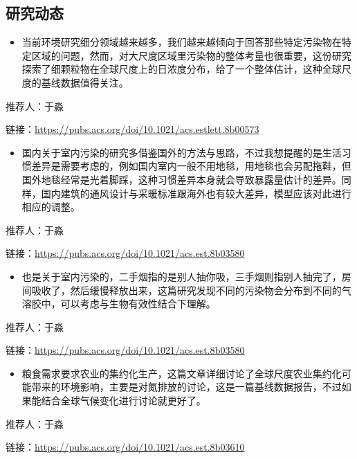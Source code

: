 \documentclass[
]{book}
\providecommand{\tightlist}{%
  \setlength{\itemsep}{0pt}\setlength{\parskip}{0pt}}
\begin{document}
\hypertarget{ux7814ux7a76ux52a8ux6001-12}{%
\subsection*{研究动态}\label{ux7814ux7a76ux52a8ux6001-12}}

\begin{itemize}
\tightlist
\item
  当前环境研究细分领域越来越多，我们越来越倾向于回答那些特定污染物在特定区域的问题，然而，对大尺度区域里污染物的整体考量也很重要，这份研究探索了细颗粒物在全球尺度上的日浓度分布，给了一个整体估计，这种全球尺度的基线数据值得关注。
\end{itemize}

推荐人：于淼

链接：\url{https://pubs.acs.org/doi/10.1021/acs.estlett.8b00573}

\begin{itemize}
\tightlist
\item
  国内关于室内污染的研究多借鉴国外的方法与思路，不过我想提醒的是生活习惯差异是需要考虑的，例如国内室内一般不用地毯，用地毯也会另配拖鞋，但国外地毯经常是光着脚踩，这种习惯差异本身就会导致暴露量估计的差异。同样，国内建筑的通风设计与采暖标准跟海外也有较大差异，模型应该对此进行相应的调整。
\end{itemize}

推荐人：于淼

链接：\url{https://pubs.acs.org/doi/10.1021/acs.est.8b03580}

\begin{itemize}
\tightlist
\item
  也是关于室内污染的，二手烟指的是别人抽你吸，三手烟则指别人抽完了，房间吸收了，然后缓慢释放出来，这篇研究发现不同的污染物会分布到不同的气溶胶中，可以考虑与生物有效性结合下理解。
\end{itemize}

推荐人：于淼

链接：\url{https://pubs.acs.org/doi/10.1021/acs.est.8b03580}

\begin{itemize}
\tightlist
\item
  粮食需求要求农业的集约化生产，这篇文章详细讨论了全球尺度农业集约化可能带来的环境影响，主要是对氮排放的讨论，这是一篇基线数据报告，不过如果能结合全球气候变化进行讨论就更好了。
\end{itemize}

推荐人：于淼

链接：\url{https://pubs.acs.org/doi/10.1021/acs.est.8b03610}
\end{document}
